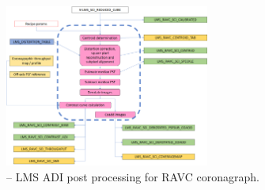 \begin{figure}[hb]
  \centering
  \includegraphics[width=0.6\textwidth]{./figures/metis_lms_adi_ravc}
  \caption[Recipe: ]{ -- LMS ADI post processing for RAVC coronagraph. 
    }
  \label{fig:metis_lms_adi_ravc}
\end{figure}
